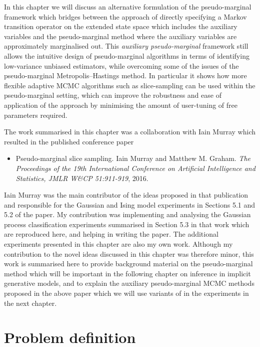 In this chapter we will discuss an alternative formulation of the pseudo-marginal framework which bridges between the approach of directly specifying a Markov transition operator on the extended state space which includes the auxiliary variables and the pseudo-marginal method where the auxiliary variables are approximately marginalised out. This \emph{auxiliary pseudo-marginal} framework still allows the intuitive design of pseudo-marginal algorithms in terms of identifying low-variance unbiased estimators, while overcoming some of the issues of the pseudo-marginal Metropolis--Hastings method. In particular it shows how more flexible adaptive \ac{MCMC} algorithms such as slice-sampling can be used within the pseudo-marginal setting, which can improve the robustness and ease of application of the approach by minimising the amount of user-tuning of free parameters required.

The work summarised in this chapter was a collaboration with Iain Murray which resulted in the published conference paper
\begin{itemize}
 \item Pseudo-marginal slice sampling. Iain Murray and Matthew M. Graham. \emph{The Proceedings of the 19th International Conference on Artificial Intelligence and Statistics, JMLR W\&CP 51:911-919}, 2016.
\end{itemize}
Iain Murray was the main contributor of the ideas proposed in that publication and responsible for the Gaussian and Ising model experiments in Sections 5.1 and 5.2 of the paper. My contribution was implementing and analysing the Gaussian process classification experiments summarised in Section 5.3 in that work which are reproduced here, and helping in writing the paper. The additional experiments presented in this chapter are also my own work. Although my contribution to the novel ideas discussed in this chapter was therefore minor, this work is summarised here to provide background material on the pseudo-marginal method which will be important in the following chapter on inference in implicit generative models, and to explain the auxiliary pseudo-marginal \ac{MCMC} methods proposed in the above paper which we will use variants of in the experiments in the next chapter.

\section{Problem definition}

